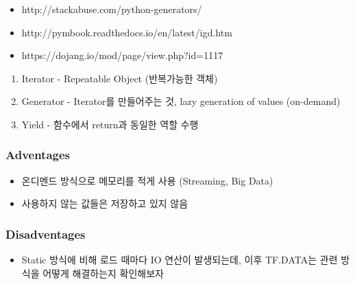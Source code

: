\documentclass[11pt]{article}
\providecommand{\tightlist}{%
      \setlength{\itemsep}{0pt}\setlength{\parskip}{0pt}}
\begin{document}
\begin{itemize}
\item
  http://stackabuse.com/python-generators/
\item
  http://pymbook.readthedocs.io/en/latest/igd.htm
\item
  https://dojang.io/mod/page/view.php?id=1117
\end{itemize}

\begin{enumerate}
\def\labelenumi{\arabic{enumi}.}
\item
  Iterator - Repeatable Object (반복가능한 객체)
\item
  Generator - Iterator를 만들어주는 것, lazy generation of values
  (on-demand)
\item
  Yield - 함수에서 return과 동일한 역할 수행
\end{enumerate}

\hypertarget{adventages}{%
\subsubsection{Adventages}\label{adventages}}

\begin{itemize}
\item
  온디멘드 방식으로 메모리를 적게 사용 (Streaming, Big Data)
\item
  사용하지 않는 값들은 저장하고 있지 않음
\end{itemize}

\hypertarget{disadventages}{%
\subsubsection{Disadventages}\label{disadventages}}

\begin{itemize}
\tightlist
\item
  Static 방식에 비해 로드 때마다 IO 연산이 발생되는데, 이후 TF.DATA는
  관련 방식을 어떻게 해결하는지 확인해보자
\end{itemize}
\end{document}
